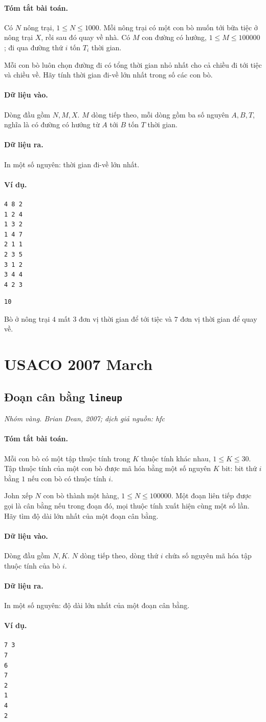 \documentclass[11pt]{article}
\newcommand{\problem}[4]{%
  \subsection[#1 (#2)]{#1 \hfill {\normalsize\texttt{#2}}}%
  \noindent\textit{#3. #4}\par\smallskip
}
\newcommand{\iosec}[1]{\paragraph{#1}}
\begin{document}
\iosec{Tóm tắt bài toán.}
Có \(N\) nông trại, \(1\le N\le 1000\). Mỗi nông trại có một con bò muốn tới
bữa tiệc ở nông trại \(X\), rồi sau đó quay về nhà. Có \(M\) con đường có
hướng, \(1\le M\le 100000\); đi qua đường thứ \(i\) tốn \(T_i\) thời gian.

Mỗi con bò luôn chọn đường đi có tổng thời gian nhỏ nhất cho cả chiều đi tới
tiệc và chiều về. Hãy tính thời gian đi-về lớn nhất trong số các con bò.

\iosec{Dữ liệu vào.}
Dòng đầu gồm \(N,M,X\). \(M\) dòng tiếp theo, mỗi dòng gồm ba số nguyên
\(A,B,T\), nghĩa là có đường có hướng từ \(A\) tới \(B\) tốn \(T\) thời gian.

\iosec{Dữ liệu ra.}
In một số nguyên: thời gian đi-về lớn nhất.

\iosec{Ví dụ.}
\begin{verbatim}
4 8 2
1 2 4
1 3 2
1 4 7
2 1 1
2 3 5
3 1 2
3 4 4
4 2 3
\end{verbatim}

\begin{verbatim}
10
\end{verbatim}

Bò ở nông trại \(4\) mất \(3\) đơn vị thời gian để tới tiệc và \(7\) đơn vị
thời gian để quay về.

\section{USACO 2007 March}

\problem{Đoạn cân bằng}{lineup}{Nhóm vàng}{Brian Dean, 2007; dịch giả nguồn: hfc}

\iosec{Tóm tắt bài toán.}
Mỗi con bò có một tập thuộc tính trong \(K\) thuộc tính khác nhau,
\(1\le K\le 30\). Tập thuộc tính của một con bò được mã hóa bằng một số nguyên
\(K\) bit: bit thứ \(i\) bằng \(1\) nếu con bò có thuộc tính \(i\).

John xếp \(N\) con bò thành một hàng, \(1\le N\le 100000\). Một đoạn liên
tiếp được gọi là cân bằng nếu trong đoạn đó, mọi thuộc tính xuất hiện cùng một
số lần. Hãy tìm độ dài lớn nhất của một đoạn cân bằng.

\iosec{Dữ liệu vào.}
Dòng đầu gồm \(N,K\). \(N\) dòng tiếp theo, dòng thứ \(i\) chứa số nguyên mã
hóa tập thuộc tính của bò \(i\).

\iosec{Dữ liệu ra.}
In một số nguyên: độ dài lớn nhất của một đoạn cân bằng.

\iosec{Ví dụ.}
\begin{verbatim}
7 3
7
6
7
2
1
4
2
\end{verbatim}
\end{document}
